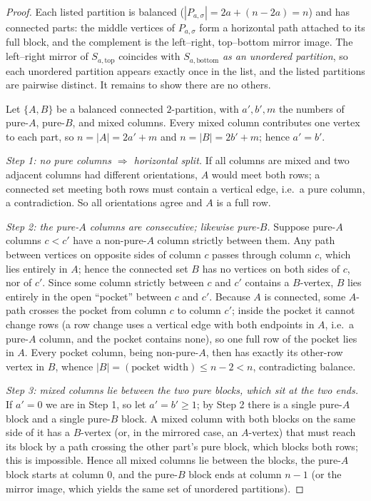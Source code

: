 \documentclass[11pt]{article}
\begin{document}
\begin{proof}
Each listed partition is balanced ($|P_{a,\sigma}| = 2a + (n-2a) = n$) and
has connected parts: the middle vertices of $P_{a,\sigma}$ form a
horizontal path attached to its full block, and the complement is the
left--right, top--bottom mirror image. The left--right mirror of
$S_{a,\mathrm{top}}$ coincides with $S_{a,\mathrm{bottom}}$ \emph{as an
unordered partition}, so each unordered partition appears exactly once in
the list, and the listed partitions are pairwise distinct. It remains to
show there are no others.

Let $\{A, B\}$ be a balanced connected $2$-partition, with $a', b', m$ the
numbers of pure-$A$, pure-$B$, and mixed columns. Every mixed column
contributes one vertex to each part, so $n = |A| = 2a' + m$ and
$n = |B| = 2b' + m$; hence $a' = b'$.

\emph{Step 1: no pure columns $\Rightarrow$ horizontal split.} If all
columns are mixed and two adjacent columns had different orientations,
$A$ would meet both rows; a connected set meeting both rows must contain a
vertical edge, i.e.\ a pure column, a contradiction. So all orientations
agree and $A$ is a full row.

\emph{Step 2: the pure-$A$ columns are consecutive; likewise pure-$B$.}
Suppose pure-$A$ columns $c < c'$ have a non-pure-$A$ column strictly
between them. Any path between vertices on opposite sides of column $c$
passes through column $c$, which lies entirely in $A$; hence the connected
set $B$ has no vertices on both sides of $c$, nor of $c'$. Since some
column strictly between $c$ and $c'$ contains a $B$-vertex, $B$ lies
entirely in the open ``pocket'' between $c$ and $c'$. Because $A$ is
connected, some $A$-path crosses the pocket from column $c$ to column
$c'$; inside the pocket it cannot change rows (a row change uses a
vertical edge with both endpoints in $A$, i.e.\ a pure-$A$ column, and the
pocket contains none), so one full row of the pocket lies in $A$. Every
pocket column, being non-pure-$A$, then has exactly its other-row vertex
in $B$, whence $|B| = (\text{pocket width}) \le n - 2 < n$, contradicting
balance.

\emph{Step 3: mixed columns lie between the two pure blocks, which sit at
the two ends.} If $a' = 0$ we are in Step 1, so let $a' = b' \ge 1$; by
Step 2 there is a single pure-$A$ block and a single pure-$B$ block. A
mixed column with both blocks on the same side of it has a $B$-vertex
(or, in the mirrored case, an $A$-vertex) that must reach its block by a
path crossing the other part's pure block, which blocks both rows; this
is impossible. Hence all mixed columns lie between the blocks, the pure-$A$
block starts at column $0$, and the pure-$B$ block ends at column $n-1$
(or the mirror image, which yields the same set of unordered partitions).


\end{proof}
\end{document}
